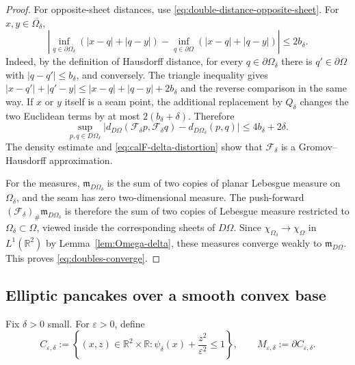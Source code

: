 \documentclass[11pt]{amsart}
\numberwithin{equation}{section}
\newcommand{\R}{\mathbb R}
\newcommand{\Om}{\Omega}
\newcommand{\eps}{\varepsilon}
\newcommand{\mm}{\mathfrak m}
\begin{document}
\begin{proof}
For opposite-sheet distances, use \eqref{eq:double-distance-opposite-sheet}.  For
$x,y\in\overline{\Om_\delta}$,
$$
\left|
\inf_{q\in\partial\Om_\delta}(|x-q|+|q-y|)
-
\inf_{q\in\partial\Om}(|x-q|+|q-y|)
\right|
\le 2b_\delta.
$$
Indeed, by the definition of Hausdorff distance, for every
$q\in\partial\Om_\delta$ there is $q'\in\partial\Om$ with
$|q-q'|\le b_\delta$, and conversely.  The triangle inequality gives
$|x-q'|+|q'-y|\le |x-q|+|q-y|+2b_\delta$ and the reverse comparison in the same
way.  If $x$ or $y$ itself is a seam point, the additional replacement by $Q_\delta$
changes the two Euclidean terms by at most $2(b_\delta+\delta)$.  Therefore
\begin{equation}\label{eq:calF-delta-distortion}
\sup_{p,q\in D\Om_\delta}
\bigl|d_{D\Om}(\mathcal F_\delta p,\mathcal F_\delta q)-d_{D\Om_\delta}(p,q)\bigr|
\le 4b_\delta+2\delta.
\end{equation}
The density estimate and \eqref{eq:calF-delta-distortion} show that $\mathcal F_\delta$ is a
Gromov--Hausdorff approximation.

For the measures, $\mm_{D\Om_\delta}$ is the sum of two copies of planar
Lebesgue measure on $\Om_\delta$, and the seam has zero two-dimensional measure.
The push-forward $(\mathcal F_\delta)_\#\mm_{D\Om_\delta}$ is therefore the sum of two
copies of Lebesgue measure restricted to $\Om_\delta\subset\Om$, viewed inside
the corresponding sheets of $D\Om$.  Since $\chi_{\Om_\delta}\to\chi_\Om$ in
$L^1(\R^2)$ by Lemma~\ref{lem:Omega-delta}, these measures converge weakly to
$\mm_{D\Om}$.  This proves \eqref{eq:doubles-converge}.
\end{proof}

\subsection{Elliptic pancakes over a smooth convex base}

Fix $\delta>0$ small.  For $\eps>0$, define
\begin{equation}\label{eq:pancake-body-and-surface}
C_{\eps,\delta}:=\left\{(x,z)\in\R^2\times\R:
\psi_\delta(x)+\frac{z^2}{\eps^2}\le1\right\},
\qquad
M_{\eps,\delta}:=\partial C_{\eps,\delta}.
\end{equation}
\end{document}

